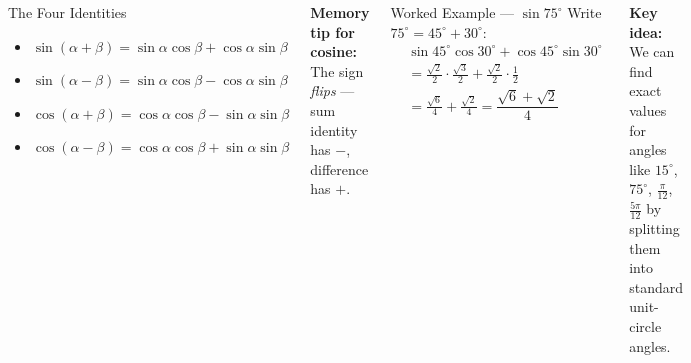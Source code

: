 \documentclass[aspectratio=169, 11pt]{beamer}
\begin{document}
\begin{frame}[t, plain]

  \begin{columns}[T]
    \begin{block}{The Four Identities}
      \begin{itemize}
        \item $\sin(\alpha+\beta) = \sin\alpha\cos\beta + \cos\alpha\sin\beta$
        \item $\sin(\alpha-\beta) = \sin\alpha\cos\beta - \cos\alpha\sin\beta$
        \item $\cos(\alpha+\beta) = \cos\alpha\cos\beta - \sin\alpha\sin\beta$
        \item $\cos(\alpha-\beta) = \cos\alpha\cos\beta + \sin\alpha\sin\beta$
      \end{itemize}
    \end{block}

    \vspace{4pt}
    \textbf{Memory tip for cosine:} The sign \emph{flips} ---
    sum identity has $-$, difference has $+$.

    \begin{block}{Worked Example --- $\sin 75^\circ$}
      Write $75^\circ = 45^\circ + 30^\circ$:
      \begin{align*}
        &\sin 45^\circ\cos 30^\circ + \cos 45^\circ\sin 30^\circ \\
        &= \tfrac{\sqrt{2}}{2}\cdot\tfrac{\sqrt{3}}{2} + \tfrac{\sqrt{2}}{2}\cdot\tfrac{1}{2} \\
        &= \tfrac{\sqrt{6}}{4} + \tfrac{\sqrt{2}}{4}
         = \dfrac{\sqrt{6}+\sqrt{2}}{4}
      \end{align*}
    \end{block}

    \vspace{4pt}
    \textbf{Key idea:} We can find exact values for angles like
    $15^\circ$, $75^\circ$, $\tfrac{\pi}{12}$, $\tfrac{5\pi}{12}$
    by splitting them into standard unit-circle angles.
  \end{columns}
\end{frame}
\end{document}
